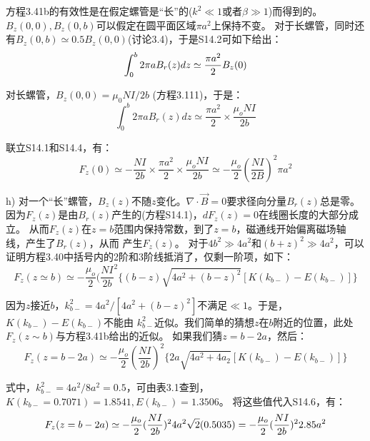 方程3.41b的有效性是在假定螺管是“长”的($k^2\ll 1$或者$\beta\gg 1$)而得到的。
$B_z(0, 0),B_z(0, b)$可以假定在圆平面区域$\pi a^2$上保持不变。
对于长螺管，同时还有$B_z(0, b)\simeq 0.5 B_z(0,0)$(讨论3.4)，于是S14.2可如下给出：
\begin{equation}
\int_{0}^{b}2\pi aB_{r}(z)dz\simeq\frac{\pi a^{2}}{2}B_{z}(0)\\%
\end{equation}

对长螺管，$B_z(0, 0)=\mu_0 NI/2b$ (方程3.111)，于是：
\begin{equation}
\int_{0}^{b}2\pi aB_{r}(z)dz\simeq\frac{\pi a^{2}}{2}\times\frac{\mu_{o}NI}{2b}%
\end{equation}

联立S14.1和S14.4，有：
\begin{equation}
F_{z}(0)\simeq-\frac{NI}{2b}\times\frac{\pi a^{2}}{2}\times\frac{\mu_{o}NI}{2b}\simeq-\frac{\mu_{o}}{2}(\frac{NI}{2B})^{2}\pi a^{2}%
\end{equation}

h) 对一个“长”螺管，$B_z(z)$不随$z$变化。$\nabla\cdot \vec{B}=0$要求径向分量$B_r(z)$总是零。
因为$F_z(z)$是由$B_r(z)$产生的(方程S14.1)，$dF_z(z)=0$在线圈长度的大部分成立。
从而$F_z(z)$在$z=b$范围内保持常数，到了$z =b$，磁通线开始偏离磁场轴线，产生了$B_r(z)$，从而
产生$F_z(z)$。
对于$4b^2\gg 4a^2$和$(b+z)^2\gg 4a^2$，可以证明方程3.40中括号内的2阶和3阶线抵消了，仅剩一阶项，如下：
\begin{equation}
F_{z}(z\simeq b)\simeq-\frac{\mu_{o}}{2}(\frac{NI}{2b}^{2}\{(b-z)\sqrt{4a^{2}+(b-z)^{2}}[K(k_{b-})-E(k_{b-})]\}%
\end{equation}

因为$z$接近$b$，$k_{b−}^2 = 4a^2/[4a^2+(b−z)^2]$不满足$\ll 1$。于是，$K(k_{b−})−E(k_{b−})$不能由
$k_{b-}^2$近似。我们简单的猜想$z$在$b$附近的位置，此处$F_z(z\sim b)$与方程3.41b给出的近似。
如果我们猜$z=b-2a$，然后：
\begin{equation}
F_{z}(z=b-2a)\simeq-\frac{\mu_{o}}{2}(\frac{NI}{2b})^{2}\{2a\sqrt{4a^{2}+4a_{2}}[K(k_{b-})-E(k_{b-})]\}%
\end{equation}

式中，$k^2_{b-}=4a^2/8a^2 =0.5$，可由表3.1查到，$K(k_{b−} =0.7071)=1.8541,E(k_{b−})=1.3506$。
将这些值代入S14.6，有：
\begin{equation}
F_{z}(z=b-2a)\simeq-\frac{\mu_{o}}{2}(\frac{NI}{2b})^{2}4a^{2}\sqrt{2}(0.5035)\\
=-\frac{\mu_{o}}{2}(\frac{NI}{2b})^{2}2.85a^{2}%
\end{equation}

